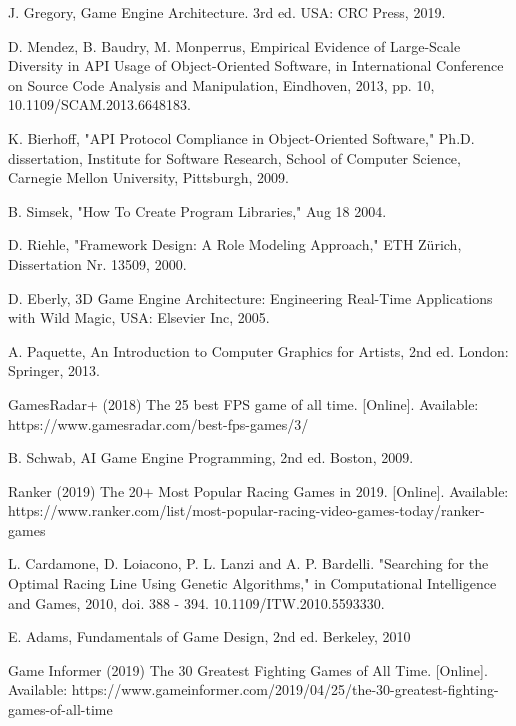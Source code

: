 \begin{thebibliography}{1}

J. Gregory, Game Engine Architecture. 3rd ed. USA: CRC Press, 2019.

D. Mendez, B. Baudry, M. Monperrus, Empirical Evidence of Large-Scale Diversity in API Usage of Object-Oriented Software, in International Conference on Source Code Analysis and Manipulation, Eindhoven, 2013, pp. 10, 10.1109/SCAM.2013.6648183.

K. Bierhoff, "API Protocol Compliance in Object-Oriented Software," Ph.D. dissertation, Institute for Software Research, School of Computer Science, Carnegie Mellon University, Pittsburgh, 2009.

B. Simsek, "How To Create Program Libraries," Aug 18 2004.

D. Riehle, "Framework Design: A Role Modeling Approach," ETH Zürich, Dissertation Nr. 13509, 2000.
 
D. Eberly, 3D Game Engine Architecture: Engineering Real-Time Applications with Wild Magic, USA: Elsevier Inc, 2005.

A. Paquette, An Introduction to Computer Graphics for Artists, 2nd ed. London: Springer, 2013.

GamesRadar+ (2018) The 25 best FPS game of all time. [Online]. Available: https://www.gamesradar.com/best-fps-games/3/

B. Schwab, AI Game Engine Programming, 2nd ed. Boston, 2009. 

Ranker (2019) The 20+ Most Popular Racing Games in 2019. [Online]. Available: https://www.ranker.com/list/most-popular-racing-video-games-today/ranker-games

L. Cardamone, D. Loiacono, P. L. Lanzi and A. P. Bardelli. "Searching for the Optimal Racing Line Using Genetic Algorithms," in Computational Intelligence and Games, 2010, doi. 388 - 394. 10.1109/ITW.2010.5593330. 

E. Adams, Fundamentals of Game Design, 2nd ed. Berkeley, 2010

Game Informer (2019) The 30 Greatest Fighting Games of All Time. [Online]. Available: https://www.gameinformer.com/2019/04/25/the-30-greatest-fighting-games-of-all-time


\end{thebibliography}
